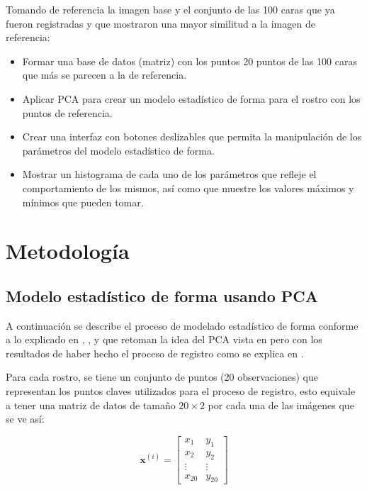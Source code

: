 \documentclass[11pt, letterpaper]{article}
\begin{document}
Tomando de referencia la imagen base y el conjunto de las 100 caras que ya fueron registradas y que mostraron una mayor similitud a la imagen de referencia:

\begin{itemize}
	\item Formar una base de datos (matriz) con los puntos 20 puntos de las 100 caras que más se parecen a la de referencia.
	\item Aplicar PCA para crear un modelo estadístico de forma para el rostro con los puntos de referencia.
	\item Crear una interfaz con botones deslizables que permita la manipulación de los parámetros del modelo estadístico de forma.
	\item Mostrar un histograma de cada uno de los parámetros que refleje el  comportamiento de los mismos, así como que muestre los valores máximos y mínimos que pueden tomar.	
	
\end{itemize}




	
\newpage
	
\section{Metodología}

\subsection{Modelo estadístico de forma usando PCA}

A continuación se describe el proceso de modelado estadístico de forma conforme a lo explicado en \cite{MPHY0026_SSM}, \cite{SSM_PCA_Basel}, \cite{cootes_pdms} y \cite{sarkalkan_statistical_2014} que retoman la idea del PCA vista en \cite{johnson2007} pero con los resultados de haber hecho el proceso de registro como se explica en \cite{coste2012image}.

Para cada rostro, se tiene un conjunto de puntos (20 observaciones) que representan los puntos claves utilizados para el proceso de registro, esto equivale a tener una matriz de datos de tamaño $20 \times 2$ por cada una de las imágenes que se ve así:


$$
\mathbf{x}^{(i)} = 
\begin{bmatrix} 
	x_1 & y_1 \\
	x_2 & y_2 \\
	\vdots & \vdots \\ 
	x_{20} & y_20 
\end{bmatrix} 
$$
\end{document}
